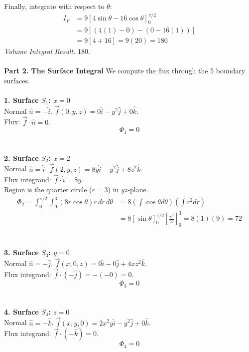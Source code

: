 \documentclass{article}
\begin{document}
Finally, integrate with respect to $\theta$:
\begin{align*}
	I_V & = 9 \left[ 4\sin\theta - 16\cos\theta \right]_0^{\pi/2} \\
	    & = 9 [ (4(1) - 0) - (0 - 16(1)) ]                        \\
	    & = 9 [ 4 + 16 ] = 9(20) = 180
\end{align*}
\textit{Volume Integral Result:} $180$.
\\
\\
\textbf{Part 2. The Surface Integral}
We compute the flux through the 5 boundary surfaces.
\\
\\
\textbf{1. Surface $S_1$: $x=0$}
\\
Normal $\hat{n} = -\hat{i}$.
$\vec{f}(0,y,z) = 0\hat{i} - y^2\hat{j} + 0\hat{k}$.
\\
Flux: $\vec{f} \cdot \hat{n} = 0$.
\[ \Phi_1 = 0 \]
\\
\\
\textbf{2. Surface $S_2$: $x=2$}
\\
Normal $\hat{n} = \hat{i}$.
$\vec{f}(2,y,z) = 8y\hat{i} - y^2\hat{j} + 8z^2\hat{k}$.
\\
Flux integrand: $\vec{f} \cdot \hat{i} = 8y$.
\\
Region is the quarter circle ($r=3$) in $yz$-plane.
\begin{align*}
	\Phi_2 = \int_0^{\pi/2} \int_0^3 (8r\cos\theta) r \, dr \, d\theta & = 8 \left(\int \cos\theta d\theta\right) \left(\int r^2 dr\right)        \\
	                                                                   & = 8 [\sin\theta]_0^{\pi/2} \left[\frac{r^3}{3}\right]_0^3 = 8(1)(9) = 72
\end{align*}
\\
\\
\textbf{3. Surface $S_3$: $y=0$}
\\
Normal $\hat{n} = -\hat{j}$.
$\vec{f}(x,0,z) = 0\hat{i} - 0\hat{j} + 4xz^2\hat{k}$.
\\
Flux integrand: $\vec{f} \cdot (-\hat{j}) = -(-0) = 0$.
\[ \Phi_3 = 0 \]
\\
\\
\textbf{4. Surface $S_4$: $z=0$}
\\
Normal $\hat{n} = -\hat{k}$.
$\vec{f}(x,y,0) = 2x^2y\hat{i} - y^2\hat{j} + 0\hat{k}$.
\\
Flux integrand: $\vec{f} \cdot (-\hat{k}) = 0$.
\[ \Phi_4 = 0 \]
\\
\\
\end{document}
